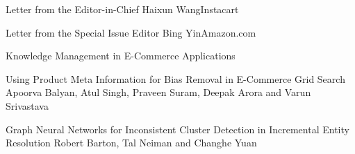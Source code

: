 \documentclass[11pt]{article}
\begin{document}


\begin{bulletin}


%
%

\begin{lettersection}


\begin{letter}{Letter from the Editor-in-Chief}
{Haixun Wang}{Instacart}

\end{letter}
%
\newpage
%
%
\begin{letter}{Letter from the Special Issue Editor} 
{Bing Yin}{Amazon.com}


\end{letter}
\end{lettersection}

\begin{articlesection}{Knowledge Management in E-Commerce Applications}

\begin{article}
{Using Product Meta Information for Bias Removal in E-Commerce Grid Search}
{Apoorva Balyan, Atul Singh, Praveen Suram, Deepak Arora and Varun Srivastava}

\end{article}

\begin{article}
{Graph Neural Networks for Inconsistent Cluster Detection in Incremental Entity Resolution}
{Robert Barton, Tal Neiman and Changhe Yuan}

\end{article}



\end{articlesection}
\end{bulletin}
\end{document}
